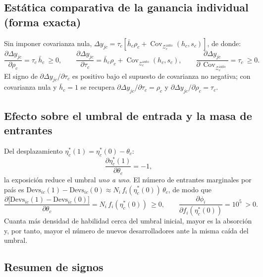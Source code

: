 \documentclass[11pt,a4paper]{article}
\newcommand{\Zauto}{\mathcal{Z}^{\mathrm{auto}}_c}
\newcommand{\Covauto}{\operatorname{Cov}_{\Zauto}}
\begin{document}
\subsection{Estática comparativa de la ganancia individual (forma exacta)}

Sin imponer covarianza nula, $\Delta y_{jc}=\tau_c[\bar h_c\rho_c+\Covauto(h_c,s_c)]$, de donde:
\[
\frac{\partial \Delta y_{jc}}{\partial \rho_c}=\tau_c\,\bar h_c\ \ge 0,
\qquad
\frac{\partial \Delta y_{jc}}{\partial \tau_c}=\bar h_c\rho_c+\Covauto(h_c,s_c),
\qquad
\frac{\partial \Delta y_{jc}}{\partial\,\Covauto}=\tau_c\ \ge 0.
\]
El signo de $\partial \Delta y_{jc}/\partial \tau_c$ es positivo bajo el supuesto de covarianza no negativa; con covarianza nula y $\bar h_c=1$ se recupera $\partial \Delta y_{jc}/\partial \tau_c=\rho_c$ y $\partial \Delta y_{jc}/\partial \rho_c=\tau_c$.

\subsection{Efecto sobre el umbral de entrada y la masa de entrantes}

Del desplazamiento $\eta_c^*(1)=\eta_c^*(0)-\theta_c$:
\[
\frac{\partial \eta_c^*(1)}{\partial \theta_c}=-1,
\]
la exposición reduce el umbral \textit{uno a uno}. El número de entrantes marginales por país es $\mathrm{Devs}_{ic}(1)-\mathrm{Devs}_{ic}(0)\approx N_i\,f_i(\eta_c^*(0))\,\theta_c$, de modo que
\[
\frac{\partial\bigl[\mathrm{Devs}_{ic}(1)-\mathrm{Devs}_{ic}(0)\bigr]}{\partial \theta_c}=N_i\,f_i(\eta_c^*(0))\ \ge 0,
\qquad
\frac{\partial \phi_i}{\partial f_i(\eta_c^*(0))}=10^5\ >0.
\]
Cuanta más densidad de habilidad cerca del umbral inicial, mayor es la absorción y, por tanto, mayor el número de nuevos desarrolladores ante la misma caída del umbral.

\subsection{Resumen de signos}
\end{document}
